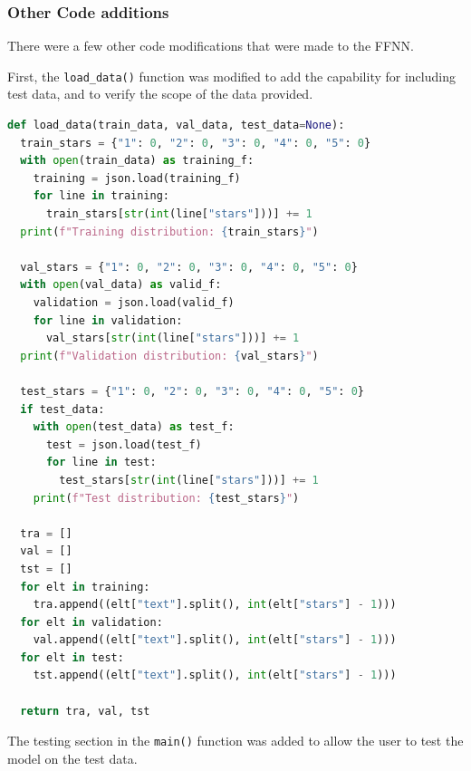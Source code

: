 \documentclass[conference]{IEEEtran}
\begin{document}
\subsubsection{Other Code additions}

There were a few other code modifications that were made to the FFNN. 

First, the \texttt{load\_data()} function was modified to add the 
capability for including test data, and to verify the scope of the data 
provided.

\begin{lstlisting}[language=Python]
def load_data(train_data, val_data, test_data=None):
  train_stars = {"1": 0, "2": 0, "3": 0, "4": 0, "5": 0}
  with open(train_data) as training_f:
    training = json.load(training_f)
    for line in training:
      train_stars[str(int(line["stars"]))] += 1
  print(f"Training distribution: {train_stars}")

  val_stars = {"1": 0, "2": 0, "3": 0, "4": 0, "5": 0}
  with open(val_data) as valid_f:
    validation = json.load(valid_f)
    for line in validation:
      val_stars[str(int(line["stars"]))] += 1
  print(f"Validation distribution: {val_stars}")

  test_stars = {"1": 0, "2": 0, "3": 0, "4": 0, "5": 0}
  if test_data:
    with open(test_data) as test_f:
      test = json.load(test_f)
      for line in test:
        test_stars[str(int(line["stars"]))] += 1
    print(f"Test distribution: {test_stars}")

  tra = []
  val = []
  tst = []
  for elt in training:
    tra.append((elt["text"].split(), int(elt["stars"] - 1)))
  for elt in validation:
    val.append((elt["text"].split(), int(elt["stars"] - 1)))
  for elt in test:
    tst.append((elt["text"].split(), int(elt["stars"] - 1)))

  return tra, val, tst
\end{lstlisting}

The testing section in the \texttt{main()} function was added to 
allow the user to test the model on the test data. 
\end{document}
